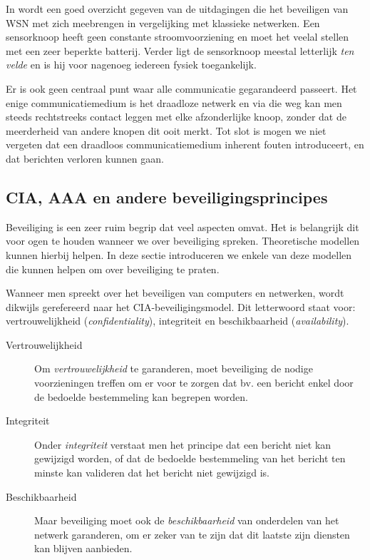 In \citep{dargie2010fundamentals} wordt een goed overzicht gegeven van de
uitdagingen die het beveiligen van WSN met zich meebrengen in vergelijking met
klassieke netwerken. Een sensorknoop heeft geen constante stroomvoorziening en
moet het veelal stellen met een zeer beperkte batterij. Verder ligt de
sensorknoop meestal letterlijk \emph{ten velde} en is hij voor nagenoeg
iedereen fysiek toegankelijk.

Er is ook geen centraal punt waar alle communicatie gegarandeerd passeert. Het
enige communicatiemedium is het draadloze netwerk en via die weg kan men steeds
rechtstreeks contact leggen met elke afzonderlijke knoop, zonder dat de
meerderheid van andere knopen dit ooit merkt. Tot slot is mogen we niet
vergeten dat een draadloos communicatiemedium inherent fouten introduceert, en
dat berichten verloren kunnen gaan.

\subsection{CIA, AAA en andere beveiligingsprincipes}
\label{subsection:cia}

Beveiliging is een zeer ruim begrip dat veel aspecten omvat. Het is belangrijk
dit voor ogen te houden wanneer we over beveiliging spreken. Theoretische
modellen kunnen hierbij helpen. In deze sectie introduceren we enkele van deze
modellen die kunnen helpen om over beveiliging te praten.

Wanneer men spreekt over het beveiligen van computers en netwerken, wordt
dikwijls gerefereerd naar het CIA-beveiligingsmodel. Dit letterwoord staat
voor: vertrouwelijkheid (\emph{confidentiality}), integriteit en
beschikbaarheid (\emph{availability}).

\begin{description}

  \item[Vertrouwelijkheid] Om \emph{vertrouwelijkheid} te garanderen, moet
  beveiliging de nodige voorzieningen treffen om er voor te zorgen dat bv. een
  bericht enkel door de bedoelde bestemmeling kan begrepen worden.
  
  \item[Integriteit] Onder \emph{integriteit} verstaat men het principe dat een
  bericht niet kan gewijzigd worden, of dat de bedoelde bestemmeling van het
  bericht ten minste kan valideren dat het bericht niet gewijzigd is.
  
  \item[Beschikbaarheid] Maar beveiliging moet ook de \emph{beschikbaarheid}
  van onderdelen van het netwerk garanderen, om er zeker van te zijn dat dit
  laatste zijn diensten kan blijven aanbieden.

\end{description}

